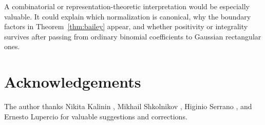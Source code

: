 \documentclass[a4paper,american,11pt]{amsart}
\numberwithin{equation}{section}
\theoremstyle{definition}
\begin{document}
A combinatorial or representation-theoretic interpretation would be especially valuable. It could explain which normalization is canonical, why the boundary factors in Theorem~\ref{thm:bailey} appear, and whether positivity or integrality survives after passing from ordinary binomial coefficients to Gaussian rectangular ones.


\section*{Acknowledgements}
The author thanks Nikita Kalinin , Mikhail Shkolnikov , Higinio Serrano ,  and Ernesto Lupercio for valuable suggestions and corrections.


\nocite{*}
\printbibliography
\end{document}
